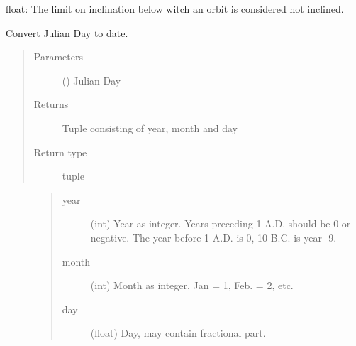 \documentclass[letterpaper,10pt,english]{sphinxmanual}
\begin{document}

\begin{fulllineitems}
\label{\detokenize{modules/dpt_tools:dpt_tools.i_lim}}
float: The limit on inclination below witch an orbit is considered not inclined.

\end{fulllineitems}


\begin{fulllineitems}
\label{\detokenize{modules/dpt_tools:dpt_tools.jd_to_date}}
Convert Julian Day to date.
\begin{quote}\begin{description}
\item[{Parameters}] \leavevmode
{} () \textendash{} Julian Day

\item[{Returns}] \leavevmode
Tuple consisting of year, month and day

\item[{Return type}] \leavevmode
tuple

\end{description}\end{quote}
\begin{description}
\item[{}] \leavevmode\begin{quote}\begin{description}
\item[{year}] \leavevmode
(int) Year as integer. Years preceding 1 A.D. should be 0 or negative. The year before 1 A.D. is 0, 10 B.C. is year -9.

\item[{month}] \leavevmode
(int) Month as integer, Jan = 1, Feb. = 2, etc.

\item[{day}] \leavevmode
(float) Day, may contain fractional part.

\end{description}\end{quote}


\end{description}
\end{fulllineitems}
\end{document}
